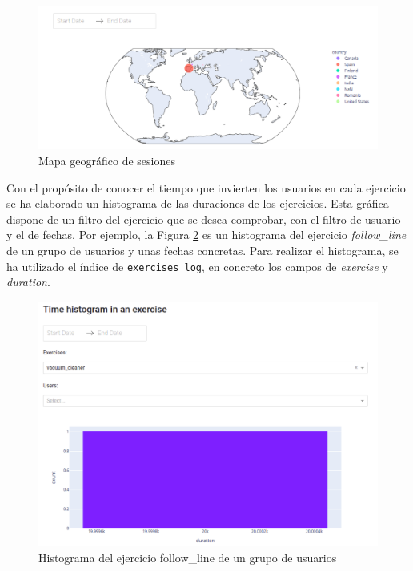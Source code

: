 \begin{figure}[H]
    \centering
    \includegraphics[width=17cm, keepaspectratio]{img/mundo.png}
    \caption{Mapa geográfico de sesiones}
    \label{fig:mundo}
\end{figure}
\newpage
Con el propósito de conocer el tiempo que invierten los usuarios en cada ejercicio se ha elaborado un histograma de las duraciones de los ejercicios. Esta gráfica dispone de un filtro del ejercicio que se desea comprobar, con el filtro de usuario y el de fechas. Por ejemplo, la Figura \ref{fig:histogram_exercise} es un histograma del ejercicio \textit{follow\_line}  de un grupo de usuarios y unas fechas concretas. Para realizar el histograma, se ha utilizado el índice de \texttt{exercises\_log}, en concreto los campos de \textit{exercise} y \textit{duration}.

\begin{figure}[H]
    \centering
    \includegraphics[width=17cm, keepaspectratio]{img/histogram_exercise.png}
    \caption{Histograma del ejercicio follow\_line de un grupo de usuarios }
    \label{fig:histogram_exercise}
\end{figure}
\newpage
